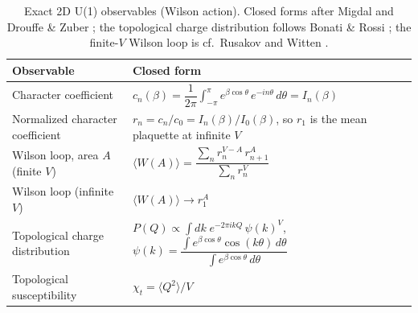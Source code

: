 \documentclass[prd, twocolumn, superscriptaddress, nofootinbib,floatfix]{revtex4-2}
\begin{document}
\begin{table}[htbp]
\centering
\small
\caption{Exact 2D U(1) observables (Wilson action). Closed forms after Migdal \cite{migdal1975} and Drouffe \& Zuber \cite{drouffezuber1983}; the topological charge distribution follows Bonati \& Rossi \cite{bonatirossi2019}; the finite-$V$ Wilson loop is cf.\ Rusakov \cite{rusakov1990} and Witten \cite{witten1991}.}
\label{tab:u1-exact-observables}
\begin{tabular}{p{4.5cm}p{11.5cm}}
\toprule
Observable & Closed form \\
\midrule
Character coefficient &
  $c_n(\beta) = \dfrac{1}{2\pi}\displaystyle\int_{-\pi}^{\pi} e^{\beta\cos\theta}\,e^{-in\theta}\,d\theta = I_n(\beta)$ \\
Normalized character coefficient &
  $r_n = c_n/c_0 = I_n(\beta)/I_0(\beta)$, so $r_1$ is the mean plaquette at infinite $V$ \\
Wilson loop, area $A$ (finite $V$) &
  $\langle W(A)\rangle = \dfrac{\sum_n r_n^{V-A}\,r_{n+1}^{A}}{\sum_n r_n^{V}}$ \\
Wilson loop (infinite $V$) &
  $\langle W(A)\rangle \to r_1^{A}$ \\
Topological charge distribution &
  $P(Q) \propto \displaystyle\int dk\; e^{-2\pi i k Q}\,\psi(k)^{V}$,\quad
  $\psi(k) = \dfrac{\int e^{\beta\cos\theta}\cos(k\theta)\,d\theta}{\int e^{\beta\cos\theta}\,d\theta}$ \\
Topological susceptibility &
  $\chi_t = \langle Q^2\rangle / V$ \\
\bottomrule
\end{tabular}
\end{table}
\end{document}
